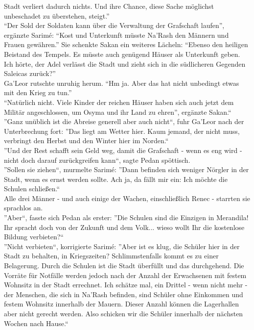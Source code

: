 Stadt verliert dadurch nichts. Und ihre Chance, diese Sache möglichst unbeschadet zu überstehen, 
steigt.''\\
``Der Sold der Soldaten kann über die Verwaltung der Grafschaft laufen'', ergänzte Sarimé: ``Kost 
und Unterkunft müsste Na'Rash den Männern und Frauen gewähren.'' Sie schenkte Sakan ein weiteres 
Lächeln: ``Ebenso den heiligen Beistand des Tempels. Es müsste auch genügend Häuser als Unterkunft 
geben. Ich hörte, der Adel verlässt die Stadt und zieht sich in die südlicheren Gegenden Saleicas 
zurück?''\\
Ga'Leor rutschte unruhig herum. ``Hm ja. Aber das hat nicht unbedingt etwas mit den Krieg zu 
tun.''\\
``Natürlich nicht. Viele Kinder der reichen Häuser haben sich auch jetzt dem Militär angeschlossen, 
um Osyma und ihr Land zu ehren'', ergänzte Sakan.``\\
''Ganz unüblich ist die Abreise generell aber auch nicht``, fuhr Ga'Leor nach der Unterbrechung 
fort: ''Das liegt am Wetter hier. Kaum jemand, der nicht muss, verbringt den Herbst und den Winter 
hier im Norden.``\\
''Und der Rest schafft sein Geld weg, damit die Grafschaft - wenn es eng wird - nicht doch darauf 
zurückgreifen kann``, sagte Pedan spöttisch.\\
''Sollen sie ziehen``, murmelte Sarimé: ''Dann befinden sich weniger Nörgler in der Stadt, wenn es 
ernst werden sollte. Ach ja, da fällt mir ein: Ich möchte die Schulen schließen.``\\
Alle drei Männer - und auch einige der Wachen, einschließlich Renec - starrten sie sprachlos an.\\
''Aber``, fasste sich Pedan als erster: ''Die Schulen sind die Einzigen in Merandila! Ihr spracht 
doch von der Zukunft und dem Volk... wieso wollt Ihr die kostenlose Bildung verbieten?``\\
''Nicht verbieten``, korrigierte Sarimé: ''Aber ist es klug, die Schüler hier in der Stadt zu 
behalten, in Kriegszeiten? Schlimmstenfalls kommt es zu einer Belagerung. Durch die Schulen ist die 
Stadt überfüllt und das durchgehend. Die Vorräte für Notfälle werden jedoch nach der Anzahl der 
Erwachsenen mit festem Wohnsitz in der Stadt errechnet. Ich schätze mal, ein Drittel - wenn nicht 
mehr - der Menschen, die sich in Na'Rash befinden, sind Schüler ohne Einkommen und festem Wohnsitz 
innerhalb der Mauern. Dieser Anzahl können die Lagerhallen aber nicht gerecht werden. Also schicken 
wir die Schüler innerhalb der nächsten Wochen nach Hause.``\\
